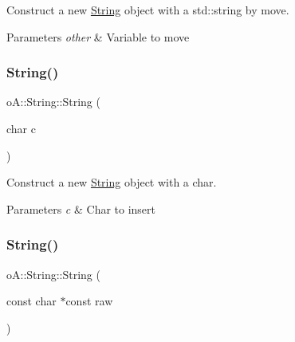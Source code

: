 Construct a new \mbox{\hyperlink{classo_a_1_1_string}{String}} object with a std\+::string by move. 


\begin{DoxyParams}{Parameters}
{\em other} & Variable to move \\
\hline
\end{DoxyParams}
\mbox{\label{classo_a_1_1_string_a5289dc4246f8adf29ade43156ad4a703}} 
\subsubsection{\texorpdfstring{String()}{String()}\hspace{0.1cm}{\footnotesize\ttfamily [6/7]}}
{\footnotesize\ttfamily o\+A\+::\+String\+::\+String (\begin{DoxyParamCaption}\item[{char}]{c }\end{DoxyParamCaption})\hspace{0.3cm}{\ttfamily [inline]}}



Construct a new \mbox{\hyperlink{classo_a_1_1_string}{String}} object with a char. 


\begin{DoxyParams}{Parameters}
{\em c} & Char to insert \\
\hline
\end{DoxyParams}
\mbox{\label{classo_a_1_1_string_adee64db6ad1f06dc35c6e960811d3734}} 
\subsubsection{\texorpdfstring{String()}{String()}\hspace{0.1cm}{\footnotesize\ttfamily [7/7]}}
{\footnotesize\ttfamily o\+A\+::\+String\+::\+String (\begin{DoxyParamCaption}\item[{const char $\ast$const}]{raw }\end{DoxyParamCaption})\hspace{0.3cm}{\ttfamily [inline]}}



